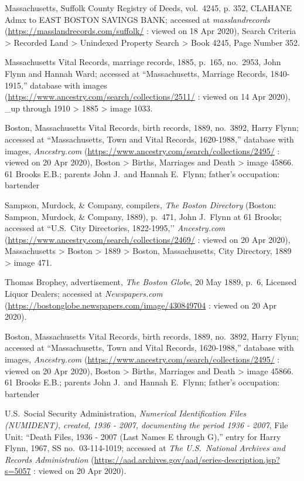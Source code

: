 \begin{thebibliography}{999}
Massachusetts, Suffolk County Registry of Deeds, vol.\ 4245, p. 352, CLAHANE Admx to EAST BOSTON SAVINGS BANK; accessed at \textit{masslandrecords} (\url{https://masslandrecords.com/suffolk/} : viewed on 18 Apr 2020), Search Criteria > Recorded Land > Unindexed Property Search > Book 4245, Page Number 352.

Massachusetts Vital Records, marriage records, 1885, p.\ 165, no.\ 2953, John Flynn and Hannah Ward; accessed at ``Massachusetts, Marriage Records, 1840-1915,'' database with images (\url{https://www.ancestry.com/search/collections/2511/} : viewed on 14 Apr 2020), \_up through 1910 > 1885 > image 1033.

Boston, Massachusetts Vital Records, birth records, 1889, no.\ 3892, Harry Flynn; accessed at ``Massachusetts, Town and Vital Records, 1620-1988,'' database with images, \textit{Ancestry.com} (\url{https://www.ancestry.com/search/collections/2495/} : viewed on 20 Apr 2020), Boston > Births, Marriages and Death > image 45866.\\
61 Brooks E.B.; parents John J.\ and Hannah E.\ Flynn; father's occupation: bartender

Sampson, Murdock, \& Company, compilers, \textit{The Boston Directory} (Boston: Sampson, Murdock, \& Company, 1889), p.\ 471, John J.\ Flynn at 61 Brooks; accessed at ``U.S.\ City Directories, 1822-1995,’’ \textit{Ancestry.com} (\url{https://www.ancestry.com/search/collections/2469/} : viewed on 20 Apr 2020), Massachusetts > Boston > 1889 > Boston, Massachusetts, City Directory, 1889 > image 471.

Thomas Brophey, advertisement, \textit{The Boston Globe}, 20 May 1889, p.\ 6, Licensed Liquor Dealers; accessed at \textit{Newspapers.com} (\url{https://bostonglobe.newspapers.com/image/430849704} : viewed on 20 Apr 2020).

Boston, Massachusetts Vital Records, birth records, 1889, no.\ 3892, Harry Flynn; accessed at ``Massachusetts, Town and Vital Records, 1620-1988,'' database with images, \textit{Ancestry.com} (\url{https://www.ancestry.com/search/collections/2495/} : viewed on 20 Apr 2020), Boston > Births, Marriages and Death > image 45866.\\
61 Brooks E.B.; parents John J.\ and Hannah E.\ Flynn; father's occupation: bartender

U.S.\ Social Security Administration, \textit{Numerical Identification Files (NUMIDENT), created, 1936 - 2007, documenting the period 1936 - 2007}, File Unit: ``Death Files, 1936 - 2007 (Last Names E through G),'' entry for Harry Flynn, 1967,  SS no.\ 03-114-1019; accessed at \textit{The U.S.\ National Archives and Records Administration} (\url{https://aad.archives.gov/aad/series-description.jsp?s=5057} : viewed on 20 Apr 2020).


\end{thebibliography}
